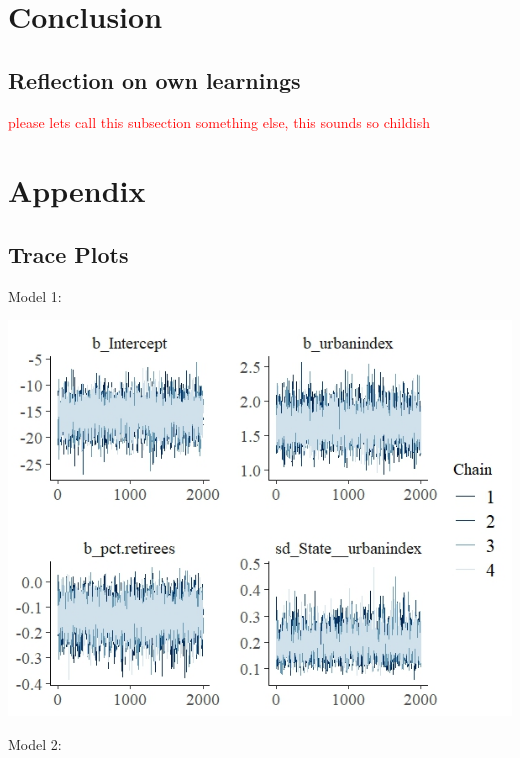 \documentclass[12pt]{article}
\begin{document}
\section{Conclusion}



\subsection{Reflection on own learnings}

\textcolor{red}{please lets call this subsection something else, this sounds so childish}




\newpage
\appendix
\setcounter{table}{0}
\renewcommand{\thetable}{A\arabic{table}}
\setcounter{figure}{0}
\renewcommand{\thefigure}{A\arabic{figure}}

\section*{Appendix}


\subsection*{Trace Plots}

Model 1:

\includegraphics[scale = 1.25]{trace_plots/trace_model1.jpeg}

Model 2:
\end{document}
